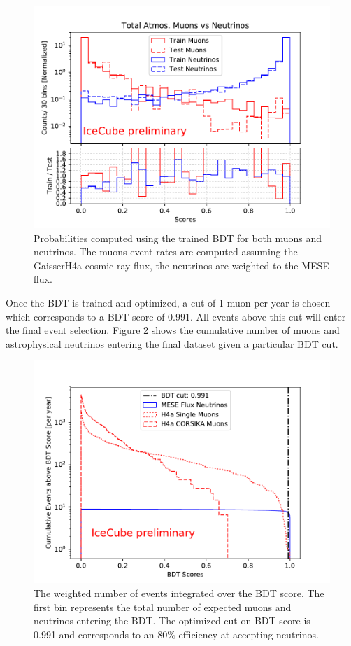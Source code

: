 \documentclass{PoS}
\begin{document}
\begin{figure}[h!]
\centering 
    \includegraphics[width=0.85\linewidth]{bdt_scores_best_muongun_resampled_corsika_no_weights_xgboost_model.pdf}
    \caption{Probabilities computed using the trained BDT for both muons and neutrinos. The muons event rates are computed assuming the GaisserH4a cosmic ray flux, the neutrinos are weighted to the MESE flux.}
\label{fig:BDToutputs}
\end{figure}

Once the BDT is trained and optimized, a cut of 1 muon per year is chosen which corresponds to a BDT score of 0.991. All events above this cut will enter the final event selection. Figure \ref{fig:BDT_cuts} shows the cumulative number of muons and astrophysical neutrinos entering the final dataset given a particular BDT cut.

\begin{figure}[h!]
\centering 
    \includegraphics[width=0.85\linewidth]{real_bdt_cut_cumulative_plot.pdf}
    \caption{The weighted number of events integrated over the BDT score. The first bin represents the total number of expected muons and neutrinos entering the BDT. The optimized cut on BDT score is 0.991 and corresponds to an 80$\%$ efficiency at accepting neutrinos.}
\label{fig:BDT_cuts}
\end{figure}
\end{document}
